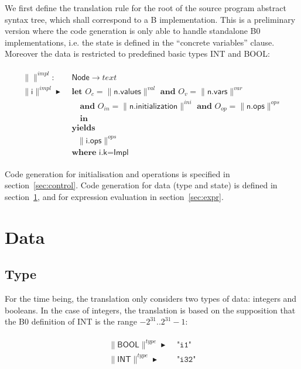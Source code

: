 \documentclass{article}
\newcommand{\trad}[2]{\ensuremath{\lVert \textsf{#1} \rVert^{\textit{#2}}}}
\DeclareMathOperator{\isdef}{\blacktriangleright}
\begin{document}
We first define the translation rule for the root of the source
program abstract syntax tree, which shall correspond to a B
implementation. This is a preliminary version where the code
generation is only able to handle standalone B0 implementations, i.e.
the state is defined in the ``concrete variables'' clause. Moreover
the data is restricted to predefined basic types \textsf{INT} and
\textsf{BOOL}:
\begin{framed}
\begin{align}
\begin{split}
  \trad{}{impl} : & \textsf{ Node} \rightarrow text \\
  \trad{i}{impl} \isdef & \textbf{ let } O_{c} = \trad{n.values}{val} \textbf{ and } O_v = \trad{n.vars}{var} \\
  & \quad \textbf{ and } O_{in} = \trad{n.initialization}{ini} \textbf{ and } O_{op} = \trad{n.ops}{ops} \\
  & \quad \textbf{ in} \\
  & \textbf{ yields } \\
  & \quad \trad{i.ops}{ops}  \\
  & \textbf{ where } \textsf{i.k} = \textsf{Impl} 
\end{split}
\end{align}
\end{framed}
Code generation for initialisation and operations is specified in
section~\ref{sec:control}. Code generation for data (type and
state) is defined in section~\ref{sec:data}, and for expression
evaluation in section~\ref{sec:expr}. 

\section{Data}
\label{sec:data}

\subsection{Type}
\label{sec:type}
For the time being, the translation only considers two types of
data: integers and booleans. In the case of integers, the translation
is based on the supposition that the B0 definition of \textsf{INT}
is the range $-2^{31}.. 2^{31}-1$:

\begin{framed}
\begin{align}
\begin{split}
  \trad{BOOL}{type} \isdef & \texttt{ "i1"} \\
  \trad{INT}{type} \isdef & \texttt{ "i32"}
\end{split}
\end{align}
\end{framed}
\end{document}
